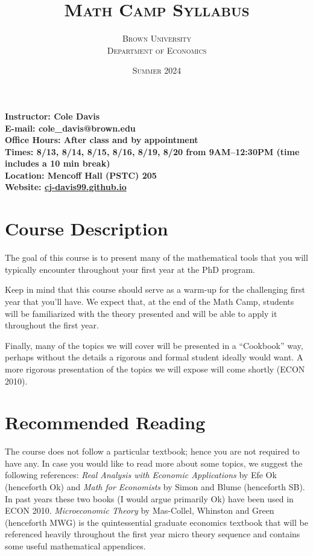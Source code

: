 \documentclass[11pt]{article}
\title{\bfseries\scshape Math Camp Syllabus}
\author{\scshape Brown University \\ \scshape Department of Economics}
\date{\scshape Summer 2024}
\begin{document}
\maketitle
{
  \bfseries
    \noindent Instructor: Cole Davis \\
    E-mail: cole\_davis@brown.edu \\
    Office Hours: After class and by appointment \\[12pt]
    Times: 8/13, 8/14, 8/15, 8/16, 8/19, 8/20 from 9AM--12:30PM (time includes a 10 min break) \\
    Location: Mencoff Hall (PSTC) 205 \\
    Website: \href{https://cj-davis99.github.io/math-camp.html}{cj-davis99.github.io}
  \vspace{12pt}
}

\section{Course Description}
\label{sec:course_description}

The goal of this course is to present many of the mathematical tools that you will typically encounter throughout your first year at the PhD program.

Keep in mind that this course should serve as a warm-up for the challenging first year that you’ll have. We expect that, at the end of the Math Camp, students will be familiarized with the theory presented and will be able to apply it throughout the first year.

Finally, many of the topics we will cover will be presented in a ``Cookbook'' way, perhaps without the details a rigorous and formal student ideally would want. A more rigorous presentation of the topics we will expose will come shortly (ECON 2010).

\section{Recommended Reading}
\label{sec:recommended_reading}

The course does not follow a particular textbook; hence you are not required to have any. In case you would like to read more about some topics, we suggest the following references: \textit{Real Analysis with Economic Applications} by Efe Ok (henceforth Ok) and \textit{Math for Economists} by Simon and Blume (henceforth SB). In past years these two books (I would argue primarily Ok) have been used in ECON 2010. \textit{Microeconomic Theory} by Mas-Collel, Whinston and Green (henceforth MWG) is the quintessential graduate economics textbook that will be referenced heavily throughout the first year micro theory sequence and contains some useful mathematical appendices. 
\end{document}
